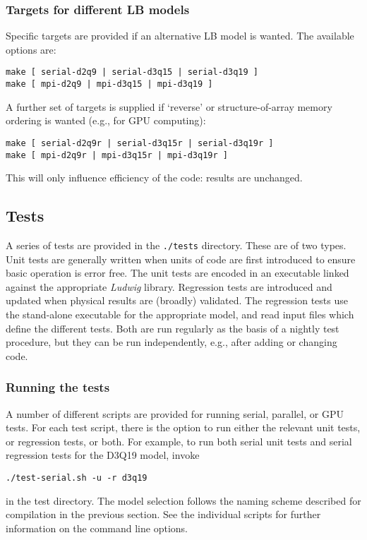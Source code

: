 \subsubsection{Targets for different LB models}

Specific targets are provided if an alternative LB model is wanted.
The available options are:
\begin{lstlisting}
make [ serial-d2q9 | serial-d3q15 | serial-d3q19 ]
make [ mpi-d2q9 | mpi-d3q15 | mpi-d3q19 ]
\end{lstlisting}
A further set of targets is supplied if `reverse' or structure-of-array
memory ordering is wanted (e.g., for GPU computing):
\begin{lstlisting}
make [ serial-d2q9r | serial-d3q15r | serial-d3q19r ]
make [ mpi-d2q9r | mpi-d3q15r | mpi-d3q19r ]
\end{lstlisting}
This will only influence efficiency of the code: results are unchanged.

\subsection{Tests}

A series of tests are provided in the \texttt{./tests} directory. These
are of two types. Unit tests are generally written when units of code
are first introduced to ensure basic operation is error free. The unit
tests are encoded in an executable linked against the appropriate
\textit{Ludwig} library.
Regression
tests are introduced and updated when physical results are (broadly)
validated. The regression tests use the stand-alone executable for
the appropriate model, and read input files which define the different
tests.
Both are run regularly as the basis of a nightly test procedure, but
they can be run independently, e.g., after adding or changing code.


\subsubsection{Running the tests}

A number of different scripts are provided for running serial, parallel,
or GPU tests. For each test script, there is the option to run either
the relevant unit tests, or regression tests, or both. For example, to
run both serial unit tests and serial regression tests for the D3Q19
model, invoke
\begin{lstlisting}
./test-serial.sh -u -r d3q19
\end{lstlisting}
in the test directory.
The model selection follows the naming scheme described for compilation
in the previous section.
See the individual scripts for further information on the command line
options.



